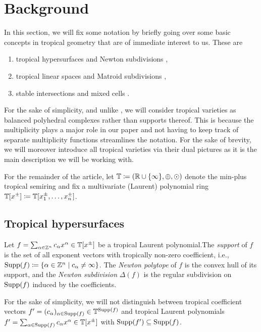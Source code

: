 \section{Background}
In this section, we will fix some notation by briefly going over some basic concepts in tropical geometry that are of immediate interest to us. These are
\begin{enumerate}
\item tropical hypersurfaces and Newton subdivisions \cite[\S 3.1]{MaclaganSturmfels2015} \cite[\S 1]{Joswig2021},
\item tropical linear spaces and Matroid subdivisions \cite[\S 4.4]{MaclaganSturmfels2015} \cite[\S 10]{Joswig2021},
\item stable intersections and mixed cells \cite[\S 3.6+4.6]{MaclaganSturmfels2015}.
\end{enumerate}

For the sake of simplicity, and unlike \cite{MaclaganSturmfels2015,Joswig2021}, we will consider tropical varieties as balanced polyhedral complexes rather than supports thereof.  This is because the multiplicity plays a major role in our paper and not having to keep track of separate multiplicity functions streamlines the notation. For the sake of brevity, we will moreover introduce all tropical varieties via their dual pictures as it is the main description we will be working with.

\begin{convention}
  For the remainder of the article, let $\mathbb{T}\coloneqq(\mathbb{R}\cup\{\infty\},\oplus,\odot)$ denote the min-plus tropical semiring and fix a multivariate (Laurent) polynomial ring $\mathbb{T}[x^\pm]\coloneqq \mathbb{T}[x_1^\pm,\dots,x_n^\pm]$.
\end{convention}

\subsection{Tropical hypersurfaces}

\begin{definition}
  Let $f=\sum_{\alpha\in\mathbb{Z}^n}c_\alpha x^\alpha\in\mathbb{T}[x^\pm]$ be a tropical Laurent polynomial.\linebreak  The \emph{support} of $f$ is the set of all exponent vectors with tropically non-zero coefficient, i.e., $\mathrm{Supp}(f)\coloneqq\{\alpha\in\mathbb{Z}^n\mid c_\alpha\neq \infty\}$.  The \emph{Newton polytope} of $f$ is the convex hull of its support, and the \emph{Newton subdivision} $\Delta(f)$ is the regular subdivision on $\operatorname{Supp}(f)$ induced by the coefficients.

  For the sake of simplicity, we will not distinguish between tropical coefficient vectors $f'=(c_\alpha)_{\alpha\in\operatorname{Supp}(f)}\in \mathbb{T}^{\operatorname{Supp}(f)}$ and tropical Laurent polynomials $f'=\sum_{\alpha\in\operatorname{Supp}(f)}c_\alpha x^\alpha\in\mathbb{T}[x^\pm]$ with $\operatorname{Supp}(f')\subseteq\operatorname{Supp}(f)$.
\end{definition}

